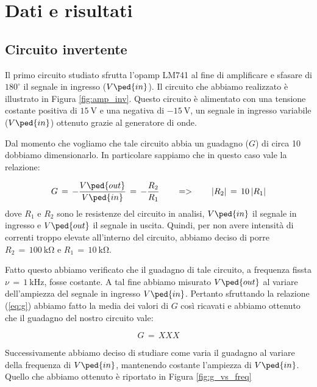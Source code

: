 \section*{Dati e risultati}

\subsection*{Circuito invertente}

Il primo circuito studiato sfrutta l'opamp LM741 al fine di amplificare e sfasare di $180^\circ$ il segnale in ingresso ($V\ped{in}$). Il circuito che abbiamo realizzato è illustrato in Figura \ref{fig:amp_inv}.
Questo circuito è alimentato con una tensione costante positiva di $\SI{+15}{\volt}$ e una negativa di $\SI{-15}{\volt}$, un segnale in ingresso variabile ($V\ped{in}$) ottenuto grazie al generatore di onde.

Dal momento che vogliamo che tale circuito abbia un guadagno ($G$) di circa 10 dobbiamo dimensionarlo. In particolare sappiamo che in questo caso vale la relazione:

\begin{equation}
        G\,=\,-\frac{V\ped{out}}{V\ped{in}}\,=\,-\frac{R_2}{R_1} \qquad => \qquad |R_2|\,=\,10\,|R_1|
        \label{eq:g}
\end{equation}
%
dove $R_1$ e $R_2$ sono le resistenze del circuito in analisi, $V\ped{in}$ il segnale in ingresso e $V\ped{out}$ il segnale in uscita. Quindi, per non avere intensità di correnti troppo elevate all'interno del circuito, abbiamo deciso di porre $R_2\,=\,\SI{100}{\kilo\ohm}$ e $R_1\,=\,\SI{10}{\kilo\ohm}$.

Fatto questo abbiamo verificato che il guadagno di tale circuito, a frequenza fissta $\nu\,=\,\SI{1}{\kilo\hertz}$, fosse costante. A tal fine abbiamo misurato $V\ped{out}$ al variare dell'ampiezza del segnale in ingresso $V\ped{in}$. Pertanto sfruttando la relazione (\ref{eq:g}) abbiamo fatto la media dei valori di $G$ così ricavati e abbiamo ottenuto che il guadagno del nostro circuito vale:

\begin{equation}
        G\,=\, XXX
\end{equation}

Successivamente abbiamo deciso di studiare come varia il guadagno al variare della frequenza di $V\ped{in}$, mantenendo costante l'ampiezza di $V\ped{in}$. Quello che abbiamo ottenuto è riportato in Figura \ref{fig:g_vs_freq}

